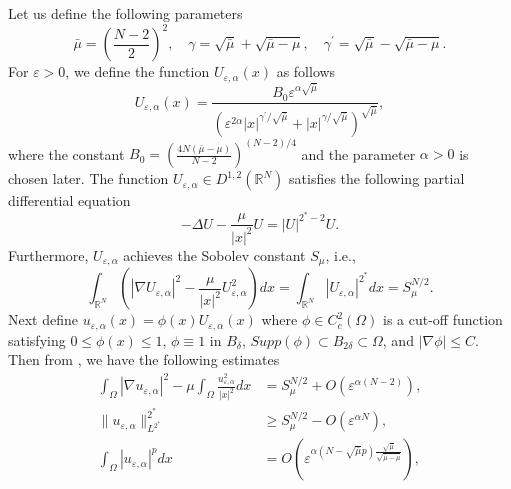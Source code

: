 \documentclass[11pt]{article}
\newcommand{\al} {\alpha}
\newcommand{\om} {\Omega}
\newcommand{\grad}{\nabla}
\begin{document}
Let us define the following parameters
\begin{equation*}
    \bar{\mu} = \left( \frac{N-2}{2} \right)^2, \quad \gamma = \sqrt{\bar{\mu}} + \sqrt{\bar{\mu} - \mu}, \quad \gamma^{\prime} = \sqrt{\bar{\mu}} - \sqrt{\bar{\mu} - \mu}.
\end{equation*}
For $\varepsilon > 0$, we define the function $U_{\varepsilon,\al}(x)$ as follows
\begin{equation*}
    U_{\varepsilon,\al}(x) =  \frac{B_0 \varepsilon^{ \alpha \sqrt{\bar{\mu}}}}{\left( \varepsilon^{2\alpha} |x|^{\gamma^{\prime}/\sqrt{\bar{\mu}}} + |x|^{\gamma/\sqrt{\bar{\mu}}} \right)^{\sqrt{\bar{\mu}}}},
\end{equation*}
where the constant $B_0 = \left( \frac{4N(\bar{\mu} - \mu)}{N-2} \right)^{(N-2)/4}$ and the parameter $\al > 0$ is chosen later.
The function $U_{\varepsilon,\al}\in D^{1,2}(\mathbb{R}^N)$ satisfies the following partial differential equation
\begin{equation*}
    -\Delta U - \frac{\mu}{|x|^2} U = |U|^{2^*-2} U.
\end{equation*}
Furthermore, $U_{\varepsilon,\al}$ achieves the Sobolev constant $S_{\mu}$, i.e.,
\begin{equation*}
    \int_{\mathbb{R}^N} \left( |\nabla U_{\varepsilon,\al}|^2 - \frac{\mu}{|x|^2} U_{\varepsilon,\al}^2 \right) dx = \int_{\mathbb{R}^N} |U_{\varepsilon,\al}|^{2^*} dx = S_{\mu}^{N/2}.
\end{equation*}
Next define $u_{\varepsilon,\al}(x) = \phi (x) U_{\varepsilon,\al}(x)$ where $\phi \in C_{c}^2(\om)$ is a cut-off function satisfying $0 \leq \phi(x) \leq 1$, $\phi \equiv 1$ in $B_{\delta} $, $Supp(\phi) \subset B_{2\delta} \subset \om$, and $|\grad \phi |\leq C$. Then from \cite{chen2003estimates}, we have the following estimates 
\begin{align}
\int_{\Omega} |\nabla u_{\varepsilon,\al}|^2 - \mu \int_{\Omega} \frac{u_{\varepsilon,\al}^2}{|x|^2} dx&= S_{\mu}^{N/2} + O(\varepsilon^{\al (N-2)}),
\label{eq:norm_upper_bound}\\
\| u_{\varepsilon,\al} \|^{2^*}_{L^{2^*}} &\geq S_{\mu}^{N/2} - O( \varepsilon^{\al N} ),
\label{eq:norm_lower_bound}\\
\int_{\om}|u_{\varepsilon,\al}|^{p}dx &= O(\varepsilon^{ \al (N - \sqrt{\bar\mu}p)\frac{\sqrt{\bar\mu}}{\sqrt{\bar\mu - \mu}}}),\label{eq:lower_bound_norm_r}
\end{align}
\end{document}
